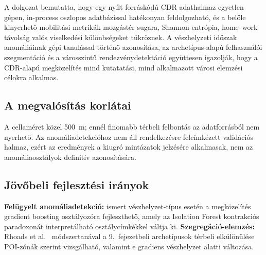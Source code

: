 
A dolgozat bemutatta, hogy egy nyílt forráskódú CDR adathalmaz egyetlen gépen, in-process oszlopos adatbázissal hatékonyan feldolgozható, és a belőle kinyerhető mobilitási metrikák mozgástér sugara, Shannon-entrópia, home–work távolság valós viselkedési különbségeket tükröznek. A vészhelyzeti időszak anomáliáinak gépi tanulással történő azonosítása, az archetípus-alapú felhasználói szegmentáció és a városszintű rendezvénydetektáció együttesen igazolják, hogy a CDR-alapú megközelítés mind kutatatási, mind alkalmazott városi elemzési célokra alkalmas.

\subsection{A megvalósítás korlátai}

A cellaméret közel 500~m; ennél finomabb térbeli felbontás az adatforrásból nem nyerhető. Az anomáliadetekcióhoz nem áll rendelkezésre felcímkézett validációs halmaz, ezért az eredmények a kiugró mintázatok jelzésére alkalmasak, nem az anomáliaosztályok definitív azonosítására.

\subsection{Jövőbeli fejlesztési irányok}

\textbf{Felügyelt anomáliadetekció:} ismert vészhelyzet-típus esetén a megközelítés gradient boosting osztályozóra fejleszthető, amely az Isolation Forest kontrakciós paradoxonát interpretálható osztálycímkékkel váltja ki. \textbf{Szegregáció-elemzés:} Rhoads et al.\ \cite{rhoads2020measuring} módszertanával a 9.~fejezetbeli archetípusok térbeli elkülönülése POI-zónák szerint vizsgálható, valamint e gradiens vészhelyzet alatti változása.
